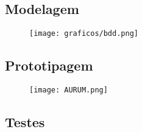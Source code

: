 \documentclass[
	article,			%
	12pt,				%
	oneside,			%
	a4paper,			%
	english,			%
	brazil,				%
	sumario=tradicional
	]{abntex2}
\begin{document}
\subsection{Modelagem}
\begin{center}
\begin{figure}[H]
    \centering
    \begin{adjustbox}{max width=0.95\paperwidth,center}
        \texttt{[image: graficos/bdd.png]}
    \end{adjustbox}
    \label{gra_logo}
\end{figure}
\end{center}




\subsection{Prototipagem}

\begin{figure}[!htbp]
    \centering
    \texttt{[image: AURUM.png]}
    \label{fig:enter-label}
\end{figure}









\subsection{Testes}
\end{document}
